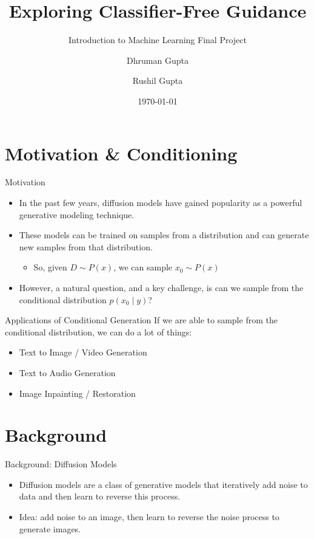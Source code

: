 \documentclass[11pt]{beamer}
\title{Exploring Classifier-Free Guidance}
\subtitle{ Introduction to Machine Learning Final Project}
\author{Dhruman Gupta \and Rushil Gupta}
\date{\today}
\begin{document}
\begin{frame}
  \titlepage
\end{frame}



\section{Motivation \& Conditioning}
\begin{frame}{Motivation}
  \begin{itemize}
    \item In the past few years, diffusion models have gained popularity as a powerful generative modeling technique.
    \item These models can be trained on samples from a distribution and can generate new samples from that distribution.
    \begin{itemize}
      \item So, given $D \sim P(x)$, we can sample $x_0 \sim P(x)$
    \end{itemize}
    \item However, a natural question, and a key challenge, is can we sample from the conditional distribution $p(x_0\mid y)$?
  \end{itemize}
\end{frame}

\begin{frame}{Applications of Conditional Generation}
  If we are able to sample from the conditional distribution, we can do a lot of things:
  \begin{itemize}
    \item Text to Image / Video Generation
    \item Text to Audio Generation
    \item Image Inpainting / Restoration
  \end{itemize}
\end{frame}

\section{Background}
\begin{frame}{Background: Diffusion Models}
  \begin{itemize}
    \item Diffusion models are a class of generative models that iteratively add noise to data and then learn to reverse this process.
    \item Idea: add noise to an image, then learn to reverse the noise process to generate images.
  \end{itemize}
\end{frame}
\end{document}

